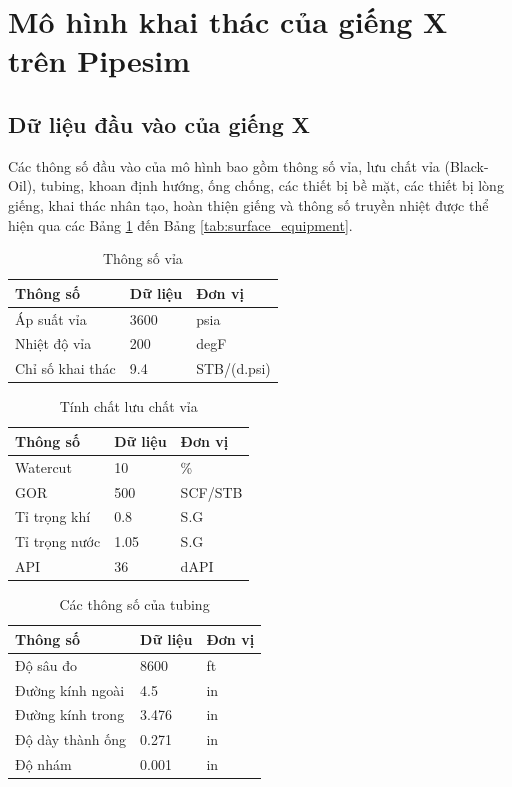\documentclass[12pt,a4paper]{report}
\begin{document}
\section{Mô hình khai thác của giếng X trên Pipesim}
\subsection{Dữ liệu đầu vào của giếng X}

Các thông số đầu vào của mô hình bao gồm thông số vỉa, lưu chất vỉa (Black-Oil), tubing, khoan định hướng, ống chống, các thiết bị bề mặt, các thiết bị lòng giếng, khai thác nhân tạo, hoàn thiện giếng và thông số truyền nhiệt được thể hiện qua các Bảng \ref{tab:reservoir_data} đến Bảng \ref{tab:surface_equipment}.

\begin{table}[h]
\caption{Thông số vỉa}\label{tab:reservoir_data}
\begin{tabularx}{\textwidth}{@{}XXX@{}}
\toprule
Thông số            & Dữ liệu & Đơn vị        \\ \midrule
Áp suất vỉa    & 3600 & psia        \\
Nhiệt độ vỉa & 200  & degF        \\
Chỉ số khai thác      & 9.4  & STB/(d.psi) \\ \bottomrule
\end{tabularx}
\end{table}

\begin{table}[h]
\caption{Tính chất lưu chất vỉa}\label{tab:fluid_properties}
\begin{tabularx}{\textwidth}{@{}XXX@{}}
\toprule
Thông số & Dữ liệu & Đơn vị    \\ \midrule
Watercut   & 10   & \%      \\
GOR        & 500  & SCF/STB \\
Tỉ trọng khí    & 0.8  & S.G     \\
Tỉ trọng nước  & 1.05 & S.G     \\
API        & 36   & dAPI    \\ \bottomrule
\end{tabularx}
\end{table}

\begin{table}[h]
\caption{Các thông số của tubing}\label{tab:tubing_params}
\begin{tabularx}{\textwidth}{@{}XXX@{}}
\toprule
Thông số         & Dữ liệu & Đơn vị \\ \midrule
Độ sâu đo        & 8600    & ft     \\
Đường kính ngoài & 4.5     & in     \\
Đường kính trong & 3.476   & in     \\
Độ dày thành ống & 0.271   & in     \\
Độ nhám          & 0.001   & in     \\ \bottomrule
\end{tabularx}
\end{table}
\end{document}
